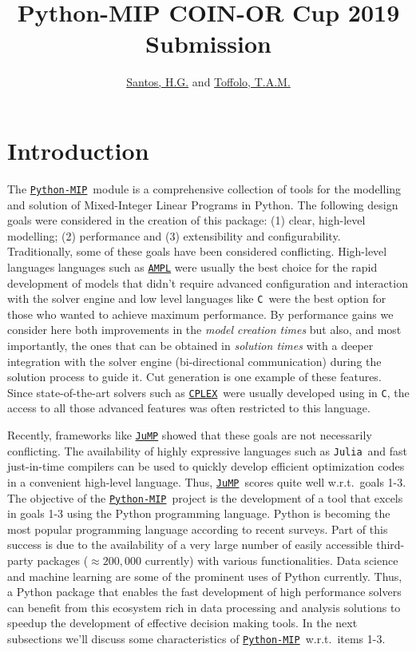 \documentclass{article}
\title{Python-MIP COIN-OR Cup 2019 Submission }
\author{\href{http://www.decom.ufop.br/haroldo/}{Santos, H.G.} and \href{http://www.decom.ufop.br/toffolo}{Toffolo, T.A.M.}}
\def\C{\texttt{C}}
\def\CPLEX{\href{https://www.ibm.com/analytics/cplex-optimizer}{\texttt{CPLEX}\textsuperscript{\textregistered}}}
\def\JuMP{\href{https://github.com/JuliaOpt/JuMP.jl}{\texttt{JuMP}}}
\def\Julia{\texttt{Julia}}
\def\PythonMIP{\href{https://github.com/coin-or/python-mip}{\texttt{Python-MIP}}}
\def\AMPL{\href{https://ampl.com}{\texttt{AMPL}}}
\begin{document}
\maketitle

\section{Introduction}

The \PythonMIP\ module is a comprehensive collection of tools for the modelling and solution of Mixed-Integer Linear Programs in Python. The following design goals were considered in the creation of this package: (1) clear, high-level modelling; (2) performance and (3) extensibility and configurability.
Traditionally, some of these goals have been considered conflicting. High-level languages languages such as \AMPL \cite{Fourer1987} were usually the best choice for the rapid development of models that didn't require advanced configuration and interaction with the solver engine and low level languages like \C\ were the best option for those who wanted to achieve maximum performance. By performance gains we consider here both improvements in the \emph{model creation times} but also, and most importantly, the ones that can be obtained in \emph{solution times} with a deeper integration with the solver engine (bi-directional communication) during the solution process to guide it. Cut generation is one example of these features. Since state-of-the-art solvers such as \CPLEX\ were usually developed using in \texttt{C}\cite{Bixby2002}, the access to all those advanced features was often restricted to this language. 

Recently, frameworks like \JuMP \cite{Dunning2015} showed that these goals are not necessarily conflicting. The availability of highly expressive languages such as \Julia\ and fast just-in-time compilers can be used to quickly develop efficient optimization codes in a convenient high-level language. Thus, \JuMP\ scores quite well w.r.t.\ goals 1-3. The objective of the \PythonMIP\ project is the development of a tool that excels in goals 1-3 using the Python programming language. Python is becoming the most popular\cite{Econ2018} programming language according to recent surveys. Part of this success is due to the availability of a very large number of easily accessible third-party packages ($\approx 200,000$ currently) with various functionalities. Data science and machine learning are some of the prominent uses of Python currently. Thus, a Python package that enables the fast development of high performance solvers can benefit from this ecosystem rich in data processing and analysis solutions to speedup the development of effective decision making tools. In the next subsections we'll discuss some characteristics of \PythonMIP\ w.r.t.\ items 1-3.
\end{document}
